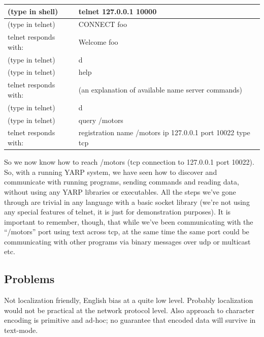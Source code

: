 \begin{tabular}{|l|p{8cm}|}
\hline
(type in shell) & telnet 127.0.0.1 10000 \\
\hline
(type in telnet) & CONNECT foo \\
\hline
telnet responds with: & Welcome foo \\
\hline
(type in telnet) & d \\
\hline
(type in telnet) & help \\
\hline
telnet responds with: & (an explanation of available name server commands) \\
\hline
(type in telnet) & d \\
\hline
(type in telnet) & query /motors \\
\hline
telnet responds with: & registration name /motors ip 127.0.0.1 port 10022 type tcp \\
\hline
\end{tabular}

So we now know how to reach /motors (tcp connection to 127.0.0.1 port 10022).
%
So, with a running YARP system, we have seen how to discover
and communicate with running programs, sending commands and reading
data, without using any YARP libraries or executables.  All the steps
we've gone through are trivial in any language with a basic socket
library (we're not using any special features of telnet, it is just
for demonstration purposes).  It is important to remember, though,
that while we've been communicating with the ``/motors'' port using
text across tcp, at the same time the same port could be communicating
with other programs via binary messages over udp or multicast etc.




\subsection{Problems}

Not localization friendly, English bias at a quite low level.
Probably localization would not be practical at the network
protocol level.  Also approach to character encoding is
primitive and ad-hoc; no guarantee that encoded data
will survive in text-mode.
